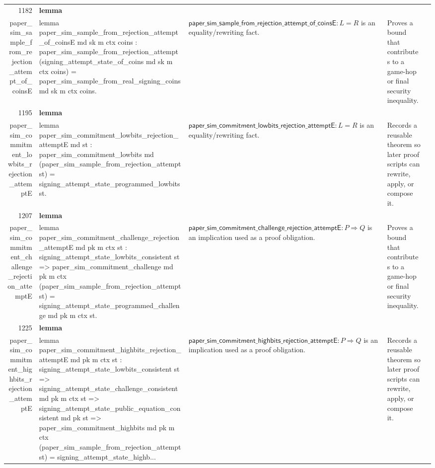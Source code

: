 \documentclass[10pt]{article}
\newcommand{\ec}[1]{\begingroup\ttfamily\scriptsize #1\endgroup}
\begin{document}
\begin{longtable}{r L{0.17\textwidth} L{0.26\textwidth} L{0.27\textwidth} L{0.20\textwidth}}
1182 & \textbf{lemma}\\\ec{paper\_sim\_sample\_from\_rejection\_attempt\_of\_coinsE} & \ec{lemma paper\_sim\_sample\_from\_rejection\_attempt\_of\_coinsE md sk m ctx coins : paper\_sim\_sample\_from\_rejection\_attempt (signing\_attempt\_state\_of\_coins md sk m ctx coins) = paper\_sim\_sample\_from\_real\_signing\_coins md sk m ctx coins.} & \(\mathsf{paper\_sim\_sample\_from\_rejection\_attempt\_of\_coinsE} : L = R\) is an equality/rewriting fact. & Proves a bound that contributes to a game-hop or final security inequality. \\
1195 & \textbf{lemma}\\\ec{paper\_sim\_commitment\_lowbits\_rejection\_attemptE} & \ec{lemma paper\_sim\_commitment\_lowbits\_rejection\_attemptE md st : paper\_sim\_commitment\_lowbits md (paper\_sim\_sample\_from\_rejection\_attempt st) = signing\_attempt\_state\_programmed\_lowbits st.} & \(\mathsf{paper\_sim\_commitment\_lowbits\_rejection\_attemptE} : L = R\) is an equality/rewriting fact. & Records a reusable theorem so later proof scripts can rewrite, apply, or compose it. \\
1207 & \textbf{lemma}\\\ec{paper\_sim\_commitment\_challenge\_rejection\_attemptE} & \ec{lemma paper\_sim\_commitment\_challenge\_rejection\_attemptE md pk m ctx st : signing\_attempt\_state\_lowbits\_consistent st => paper\_sim\_commitment\_challenge md pk m ctx (paper\_sim\_sample\_from\_rejection\_attempt st) = signing\_attempt\_state\_programmed\_challenge md pk m ctx st.} & \(\mathsf{paper\_sim\_commitment\_challenge\_rejection\_attemptE} : P \Rightarrow Q\) is an implication used as a proof obligation. & Proves a bound that contributes to a game-hop or final security inequality. \\
1225 & \textbf{lemma}\\\ec{paper\_sim\_commitment\_highbits\_rejection\_attemptE} & \ec{lemma paper\_sim\_commitment\_highbits\_rejection\_attemptE md pk m ctx st : signing\_attempt\_state\_lowbits\_consistent st => signing\_attempt\_state\_challenge\_consistent md pk m ctx st => signing\_attempt\_state\_public\_equation\_consistent md pk st => paper\_sim\_commitment\_highbits md pk m ctx (paper\_sim\_sample\_from\_rejection\_attempt st) = signing\_attempt\_state\_highb...} & \(\mathsf{paper\_sim\_commitment\_highbits\_rejection\_attemptE} : P \Rightarrow Q\) is an implication used as a proof obligation. & Records a reusable theorem so later proof scripts can rewrite, apply, or compose it. \\

\end{longtable}
\end{document}
